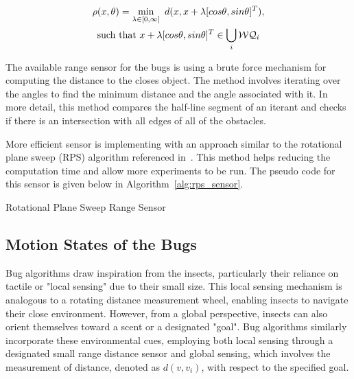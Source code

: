 \documentclass{IEEEtaes}
\newcommand{\algrule}[1][.1pt]{\par\vskip.2\baselineskip\hrule height #1\par\vskip.5\baselineskip}
\begin{document}
\vspace{-1em}
\begin{multline}
    \label{sensor}
    \rho (x,\theta) = \min_{\lambda \in [0,\infty]} \ d(x,x+\lambda[cos\theta, sin\theta]^T), \cr  \mathrm{such \ that} \ x + \lambda[cos\theta, sin\theta]^T \in \bigcup_i \mathcal{W} \mathcal{Q}_i
\end{multline}
\vspace{-1em}

The available range sensor for the bugs is using a brute force mechanism for computing the distance to the closes object. The method involves iterating over the angles to find the minimum distance and the angle associated with it. In more detail, this method compares the half-line segment of an iterant and checks if there is an intersection with all edges of all of the obstacles.

More efficient sensor is implementing with an approach similar to the rotational plane sweep (RPS) algorithm referenced in~\cite{choset}. This method helps reducing the computation time and allow more experiments to be run. The pseudo code for this sensor is given below in Algorithm~\ref{alg:rps_sensor}.

\begin{algorithm}[t]
\caption{Rotational Plane Sweep Range Sensor}
\label{alg:rps_sensor}
\end{algorithm}


\subsection{Motion States of the Bugs}

Bug algorithms draw inspiration from the insects, particularly their reliance on tactile or "local sensing" due to their small size. This local sensing mechanism is analogous to a rotating distance measurement wheel, enabling insects to navigate their close environment. However, from a global perspective, insects can also orient themselves toward a scent or a designated "goal". Bug algorithms similarly incorporate these environmental cues, employing both local sensing through a designated small range distance sensor and global sensing, which involves the measurement of distance, denoted as $d(v, v_i)$, with respect to the specified goal.
\end{document}
